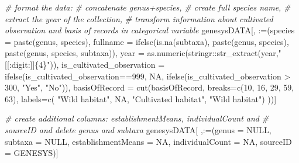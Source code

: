 \documentclass[
]{article}
\newenvironment{Shaded}{\begin{snugshade}}{\end{snugshade}}
\newcommand{\AttributeTok}[1]{\textcolor[rgb]{0.77,0.63,0.00}{#1}}
\newcommand{\CommentTok}[1]{\textcolor[rgb]{0.56,0.35,0.01}{\textit{#1}}}
\newcommand{\ConstantTok}[1]{\textcolor[rgb]{0.00,0.00,0.00}{#1}}
\newcommand{\DecValTok}[1]{\textcolor[rgb]{0.00,0.00,0.81}{#1}}
\newcommand{\FunctionTok}[1]{\textcolor[rgb]{0.00,0.00,0.00}{#1}}
\newcommand{\NormalTok}[1]{#1}
\newcommand{\SpecialCharTok}[1]{\textcolor[rgb]{0.00,0.00,0.00}{#1}}
\newcommand{\StringTok}[1]{\textcolor[rgb]{0.31,0.60,0.02}{#1}}
\begin{document}
\begin{Shaded}
\begin{Highlighting}[]
\CommentTok{\# format the data: }
\CommentTok{\# concatenate genus+species,}
\CommentTok{\# create full species name,}
\CommentTok{\# extract the year of the collection,}
\CommentTok{\# transform information about cultivated observation and basis of records in categorical variable}
\NormalTok{genesysDATA[, }\StringTok{\textasciigrave{}}\AttributeTok{:=}\StringTok{\textasciigrave{}}\NormalTok{(}\AttributeTok{species =} \FunctionTok{paste}\NormalTok{(genus, species),}
                  \AttributeTok{fullname =} \FunctionTok{ifelse}\NormalTok{(}\FunctionTok{is.na}\NormalTok{(subtaxa),}
                                    \FunctionTok{paste}\NormalTok{(genus, species),}
                                    \FunctionTok{paste}\NormalTok{(genus, species, subtaxa)),}
                  \AttributeTok{year =} \FunctionTok{as.numeric}\NormalTok{(stringr}\SpecialCharTok{::}\FunctionTok{str\_extract}\NormalTok{(year,}\StringTok{"[[:digit:]]\{4\}"}\NormalTok{)),}
                  \AttributeTok{is\_cultivated\_observation =} \FunctionTok{ifelse}\NormalTok{(is\_cultivated\_observation}\SpecialCharTok{==}\DecValTok{999}\NormalTok{,}
                                                     \ConstantTok{NA}\NormalTok{,}
                                                     \FunctionTok{ifelse}\NormalTok{(is\_cultivated\_observation }\SpecialCharTok{\textgreater{}} \DecValTok{300}\NormalTok{,}
                                                            \StringTok{"Yes"}\NormalTok{,}
                                                            \StringTok{"No"}\NormalTok{)),}
                  \AttributeTok{basisOfRecord =} \FunctionTok{cut}\NormalTok{(basisOfRecord, }
                                      \AttributeTok{breaks=}\FunctionTok{c}\NormalTok{(}\DecValTok{10}\NormalTok{, }\DecValTok{16}\NormalTok{, }\DecValTok{29}\NormalTok{, }\DecValTok{59}\NormalTok{, }\DecValTok{63}\NormalTok{),}
                                      \AttributeTok{labels=}\FunctionTok{c}\NormalTok{(}
                                        \StringTok{"Wild habitat"}\NormalTok{,}
                                        \ConstantTok{NA}\NormalTok{,}
                                        \StringTok{"Cultivated habitat"}\NormalTok{,}
                                        \StringTok{"Wild habitat"}\NormalTok{)}
\NormalTok{                                      ))]}

\CommentTok{\# create additional columns: \textquotesingle{}establishmentMeans\textquotesingle{}, \textquotesingle{}individualCount\textquotesingle{} and }
\CommentTok{\# \textquotesingle{}sourceID\textquotesingle{} and delete \textquotesingle{}genus\textquotesingle{} and \textquotesingle{}subtaxa\textquotesingle{}}
\NormalTok{genesysDATA[ ,}\StringTok{\textasciigrave{}}\AttributeTok{:=}\StringTok{\textasciigrave{}}\NormalTok{(}\AttributeTok{genus =} \ConstantTok{NULL}\NormalTok{,}
                  \AttributeTok{subtaxa =} \ConstantTok{NULL}\NormalTok{,}
                  \AttributeTok{establishmentMeans =} \ConstantTok{NA}\NormalTok{,}
                  \AttributeTok{individualCount =} \ConstantTok{NA}\NormalTok{,}
                  \AttributeTok{sourceID =} \StringTok{\textquotesingle{}GENESYS\textquotesingle{}}\NormalTok{)]}


\end{Highlighting}
\end{Shaded}
\end{document}
